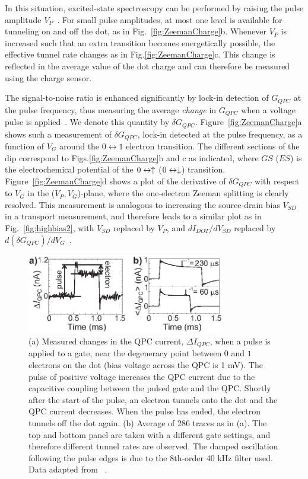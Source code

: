 \documentclass[12pt,aps,nofootinbib]{revtex4-1}
\begin{document}
In this situation, excited-state spectroscopy can be performed by
raising the pulse amplitude
$V_P$~\cite{ElzermanAPL2004,JohnsonPRB2005}. For small pulse
amplitudes, at most one level is available for tunneling on and
off the dot, as in Fig.~\ref{fig:ZeemanCharge}b. Whenever $V_P$ is
increased such that an extra transition becomes energetically
possible, the effective tunnel rate changes as in
Fig.\ref{fig:ZeemanCharge}c. This change is reflected in the
average value of the dot charge and can therefore be measured
using the charge sensor.

The signal-to-noise ratio is enhanced significantly by lock-in
detection of $G_{QPC}$ at the pulse frequency, thus measuring the
average \textit{change} in $G_{QPC}$ when a voltage pulse is
applied~\cite{Sprinzak2002}. We denote this quantity by $\delta
G_{QPC}$. Figure~\ref{fig:ZeemanCharge}a shows such a measurement
of $\delta G_{QPC}$, lock-in detected at the pulse frequency, as a
function of $V_G$ around the $0\leftrightarrow1$ electron
transition. The different sections of the dip correspond to
Figs.\ref{fig:ZeemanCharge}b and c as indicated, where $GS$ ($ES$)
is the electrochemical potential of the $0\leftrightarrow\uparrow$
($0\leftrightarrow\downarrow$) transition. Figure~\ref{fig:ZeemanCharge}d
shows a plot of the derivative of $\delta G_{QPC}$ with respect to
$V_G$ in the ($V_P,V_G$)-plane, where the one-electron Zeeman
splitting is clearly resolved. This measurement is analogous to
increasing the source-drain bias $V_{SD}$ in a transport
measurement, and therefore leads to a similar plot as in
Fig.~\ref{fig:highbias2}, with $V_{SD}$ replaced by $V_P$, and
$dI_{DOT}/dV_{SD}$ replaced by $d (\delta
G_{QPC})/dV_G$~\cite{FujisawaPRL02,ElzermanAPL2004}.

\begin{figure}[htb]
\includegraphics[width=3.4in]{hanson_fig13.eps}
\caption{(a) Measured changes in the QPC current, $\Delta
I_{QPC}$, when a pulse is applied to a gate, near the degeneracy
point between $0$ and $1$ electrons on the dot (bias voltage
across the QPC is 1 mV). The pulse of positive voltage increases
the QPC current due to the capacitive coupling between the pulsed
gate and the QPC. Shortly after the start of the pulse, an
electron tunnels onto the dot and the QPC current decreases. When
the pulse has ended, the electron tunnels off the dot again. (b)
Average of 286 traces as in (a). The top and bottom panel are
taken with a different gate settings, and therefore different
tunnel rates are observed. The damped oscillation following the
pulse edges is due to the 8th-order 40 kHz filter used. Data
adapted from ~\textcite{VandersypenAPL2004}.}
\label{fig:RealTimeTunn}
\end{figure}
\end{document}
